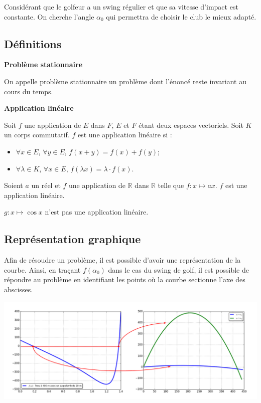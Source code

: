 \documentclass[10pt]{article}
\begin{document}
Considérant que le golfeur a un swing régulier et que sa vitesse d'impact est constante. On cherche l'angle $\alpha_0$ qui permettra de choisir le club le mieux adapté.

\subsection{Définitions}

\begin{defi}
\textbf{Problème stationnaire}

On appelle problème stationnaire un problème dont l'énoncé reste invariant au cours du temps.
\end{defi}


\begin{defi}
\textbf{Application linéaire}

Soit $f$ une application de $E$ dans $F$, $E$ et $F$ étant deux espaces vectoriels. Soit $K$ un corps commutatif. $f$ est une application linéaire si :
\begin{itemize}
\item $\forall x \in E$, $\forall y \in E$, $f(x+y)=f(x)+f(y)$;
\item $\forall \lambda \in K$, $\forall x \in E$, $f(\lambda x) =\lambda \cdot f(x)$.
\end{itemize}
\end{defi}

\begin{exemple}
Soient $a$ un réel et $f$ une application de $\mathbb{R}$ dans $\mathbb{R}$ telle que $f:x\mapsto ax $. $f$ est une application linéaire.

$g:x\mapsto \cos x$ n'est pas une application linéaire.

\end{exemple}

\subsection{Représentation graphique}

Afin de résoudre un problème, il est possible d'avoir une représentation de la courbe. Ainsi, en traçant $f(\alpha_0)$ dans le cas du swing de golf, il est possible de répondre au problème en identifiant les points où la courbe sectionne l'axe des abscisses. 

\begin{center}
\includegraphics[width=.9\textwidth]{images/InterpretationGraphique}
\end{center}
\end{document}
